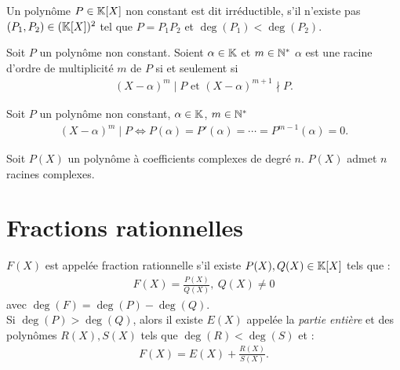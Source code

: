 \begin{definition}
	Un polynôme $P \in \mathbb{K}[X]$ non constant est dit irréductible, s'il n'existe pas $(P_1, P_2) \in (\mathbb{K}[X])^2$ tel que $P = P_1 P_2$ et $\operatorname{deg}(P_1) < \operatorname{deg}(P_2)$.
\end{definition}

\begin{definition}\label{def:ordre_mult}
	Soit $P$ un polynôme non constant. Soient $\alpha \in \mathbb{K}$ et $m \in \mathbb{N}^*$ $\alpha$ est une racine d'ordre de multiplicité $m$ de $P$ si et seulement si
	\begin{align*}
		(X - \alpha)^m \mid P \text{ et } (X - \alpha)^{m+1} \nmid P.
	\end{align*}
\end{definition}

\begin{theorem}
	Soit $P$ un polynôme non constant, $\alpha \in \mathbb{K}$, $m \in \mathbb{N}^*$
	\begin{align*}
		(X - \alpha)^m \mid P \iff P(\alpha) = P'(\alpha) = \cdots = P^{m-1}(\alpha) = 0.
	\end{align*}
\end{theorem}

\begin{theorem}
	Soit $P(X)$ un polynôme à coefficients complexes de degré $n$. $P(X)$ admet $n$ racines complexes. 
\end{theorem}

\section{Fractions rationnelles}
\begin{definition}
	$F(X)$ est appelée fraction rationnelle s'il existe $P(X), Q(X) \in \mathbb{K}[X]$ tels que :
	\begin{align*}
		F(X) = \frac{P(X)}{Q(X)},\ Q(X) \neq 0
	\end{align*}
	avec $\deg(F) = \deg(P) - \deg(Q)$. \\
	Si $\deg(P) > \deg(Q)$, alors il existe $E(X)$ appelée la \emph{partie entière} et des polynômes $R(X), S(X)$ tels que $\deg(R) < \deg(S)$ et : 
	\begin{align*}
		F(X) = E(X) + \frac{R(X)}{S(X)}.
	\end{align*}
\end{definition}

